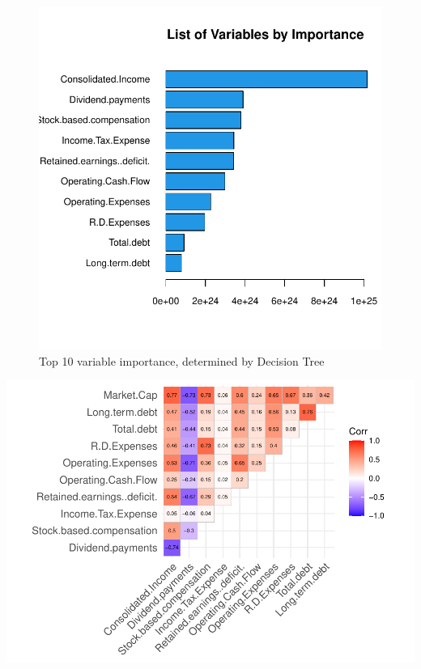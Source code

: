 \documentclass[11pt,]{article}
\begin{document}
\begin{figure}

{\centering \includegraphics{stock_analysis_files/figure-latex/variable importance-1} 

}

\caption{Top 10 variable importance, determined by Decision Tree}\label{fig:variable importance}
\end{figure}

\begin{center}\includegraphics{stock_analysis_files/figure-latex/correlation plot 2-1} \end{center}
\end{document}
